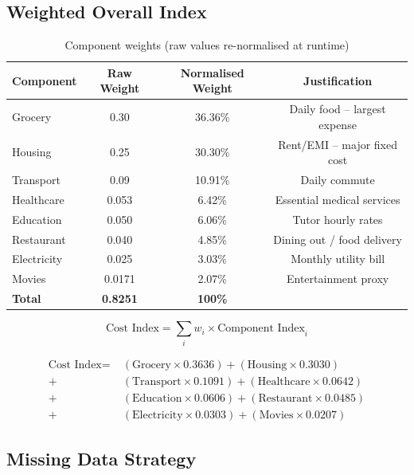 \documentclass[12pt,a4paper]{article}
\begin{document}
\subsection{Weighted Overall Index}

\begin{table}[H]
  \centering
  \begin{tabular}{lccc}
    \toprule
    \textbf{Component} & \textbf{Raw Weight} & \textbf{Normalised Weight} & \textbf{Justification} \\
    \midrule
    Grocery       & 0.30   & 36.36\% & Daily food -- largest expense \\
    Housing       & 0.25   & 30.30\% & Rent/EMI -- major fixed cost \\
    Transport     & 0.09   & 10.91\% & Daily commute \\
    Healthcare    & 0.053  &  6.42\% & Essential medical services \\
    Education     & 0.050  &  6.06\% & Tutor hourly rates \\
    Restaurant    & 0.040  &  4.85\% & Dining out / food delivery \\
    Electricity   & 0.025  &  3.03\% & Monthly utility bill \\
    Movies        & 0.0171 &  2.07\% & Entertainment proxy \\
    \midrule
    \textbf{Total} & \textbf{0.8251} & \textbf{100\%} & \\
    \bottomrule
  \end{tabular}
  \caption{Component weights (raw values re-normalised at runtime)}
\end{table}

\[
  \text{Cost Index} = \sum_{i} w_i \times \text{Component Index}_i
\]

\[
\begin{aligned}
  \text{Cost Index} =\; &(\text{Grocery} \times 0.3636) + (\text{Housing} \times 0.3030) \\
                      + &(\text{Transport} \times 0.1091) + (\text{Healthcare} \times 0.0642) \\
                      + &(\text{Education} \times 0.0606) + (\text{Restaurant} \times 0.0485) \\
                      + &(\text{Electricity} \times 0.0303) + (\text{Movies} \times 0.0207)
\end{aligned}
\]

\subsection{Missing Data Strategy}
\end{document}
